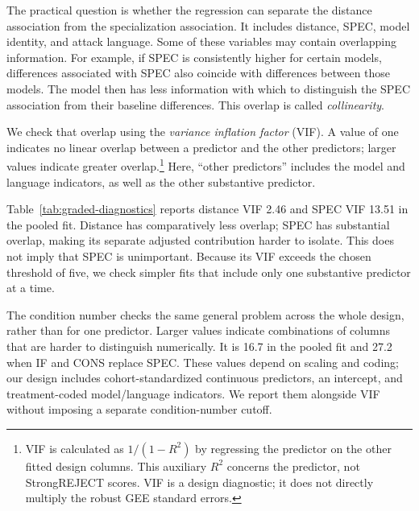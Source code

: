 The practical question is whether the regression can separate the distance association from the specialization association. It includes distance, SPEC, model identity, and attack language. Some of these variables may contain overlapping information. For example, if SPEC is consistently higher for certain models, differences associated with SPEC also coincide with differences between those models. The model then has less information with which to distinguish the SPEC association from their baseline differences. This overlap is called \emph{collinearity}.

We check that overlap using the \emph{variance inflation factor} (VIF). A value of one indicates no linear overlap between a predictor and the other predictors; larger values indicate greater overlap.\footnote{VIF is calculated as $1/(1-R^2)$ by regressing the predictor on the other fitted design columns. This auxiliary $R^2$ concerns the predictor, not StrongREJECT scores. VIF is a design diagnostic; it does not directly multiply the robust GEE standard errors.} Here, ``other predictors'' includes the model and language indicators, as well as the other substantive predictor.

Table~\ref{tab:graded-diagnostics} reports distance VIF 2.46 and SPEC VIF 13.51 in the pooled fit. Distance has comparatively less overlap; SPEC has substantial overlap, making its separate adjusted contribution harder to isolate. This does not imply that SPEC is unimportant. Because its VIF exceeds the chosen threshold of five, we check simpler fits that include only one substantive predictor at a time.

The condition number checks the same general problem across the whole design, rather than for one predictor. Larger values indicate combinations of columns that are harder to distinguish numerically. It is 16.7 in the pooled fit and 27.2 when IF and CONS replace SPEC. These values depend on scaling and coding; our design includes cohort-standardized continuous predictors, an intercept, and treatment-coded model/language indicators. We report them alongside VIF without imposing a separate condition-number cutoff.
